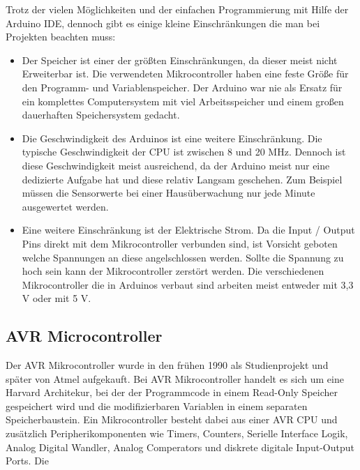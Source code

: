 Trotz der vielen Möglichkeiten und der einfachen Programmierung mit Hilfe der Arduino IDE, dennoch gibt es einige kleine Einschränkungen die man bei Projekten beachten muss:
\begin{itemize}
	\item Der Speicher ist einer der größten Einschränkungen, da dieser meist nicht Erweiterbar ist. Die verwendeten Mikrocontroller haben eine feste Größe für den Programm- und Variablenspeicher. Der Arduino war nie als Ersatz für ein komplettes Computersystem mit viel Arbeitsspeicher und einem großen dauerhaften Speichersystem gedacht.
	\item Die Geschwindigkeit des Arduinos ist eine weitere Einschränkung. Die typische Geschwindigkeit der CPU ist zwischen 8 und 20 MHz. Dennoch ist diese Geschwindigkeit meist ausreichend, da der Arduino meist nur eine dedizierte Aufgabe hat und diese relativ Langsam geschehen. Zum Beispiel müssen die Sensorwerte bei einer Hausüberwachung nur jede Minute  ausgewertet werden. 
	\item Eine weitere Einschränkung ist der Elektrische Strom. Da die Input / Output Pins direkt mit dem Mikrocontroller verbunden sind, ist Vorsicht geboten welche Spannungen an diese angelschlossen werden. Sollte die Spannung zu hoch sein kann der Mikrocontroller zerstört werden. Die verschiedenen Mikrocontroller die in Arduinos verbaut sind arbeiten meist entweder mit 3,3 V oder mit 5 V. 
\end{itemize}
\subsection{AVR Microcontroller}
Der AVR Mikrocontroller wurde in den frühen 1990 als Studienprojekt und später von Atmel aufgekauft. Bei AVR Mikrocontroller handelt es sich um eine Harvard Architekur, bei der der Programmcode in einem Read-Only Speicher gespeichert wird und die modifizierbaren Variablen in einem separaten Speicherbaustein. Ein Mikrocontroller besteht dabei aus  einer AVR CPU und zusätzlich Peripherikomponenten wie Timers, Counters, Serielle Interface Logik, Analog Digital Wandler, Analog Comperators und diskrete digitale Input-Output Ports. Die
